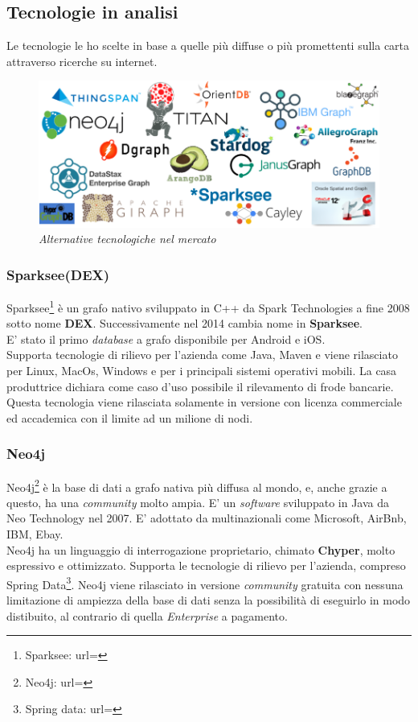 \subsection{Tecnologie in analisi}
Le tecnologie le ho scelte in base a quelle più diffuse o più promettenti sulla carta attraverso ricerche su internet.
\begin{figure}[h!]
	\centering
	\includegraphics[scale=0.35]{immagini/graphdb.png}

	\caption{\textit{Alternative tecnologiche nel mercato }}
\end{figure}

\subsubsection{Sparksee(DEX)}
Sparksee\footnote{Sparksee: url= } è un grafo nativo sviluppato in C++ da Spark Technologies a fine 2008 sotto nome \textbf{DEX}. Successivamente nel 2014 cambia nome in \textbf{Sparksee}.\\
E' stato il primo \textit{database} a grafo disponibile per Android e iOS.\\
Supporta tecnologie di rilievo per l'azienda come Java, Maven e viene rilasciato per Linux, MacOs, Windows e per i principali sistemi operativi mobili.
La casa produttrice dichiara come caso d'uso possibile il rilevamento di frode bancarie.\\
Questa tecnologia viene rilasciata solamente in versione con licenza commerciale ed accademica con il limite ad un milione di nodi.

\subsubsection{Neo4j}
Neo4j\footnote{Neo4j: url= } è la base di dati a grafo nativa più diffusa al mondo, e, anche grazie a questo, ha una \textit{community} molto ampia. E' un \textit{software} sviluppato in Java da Neo Technology nel 2007. E' adottato da multinazionali come Microsoft, AirBnb, IBM, Ebay.\\
Neo4j ha un linguaggio di interrogazione proprietario, chimato \textbf{Chyper}, molto espressivo e ottimizzato. Supporta le tecnologie di rilievo per l'azienda, compreso Spring Data\footnote{Spring data: url= }. Neo4j viene rilasciato in versione \textit{community} gratuita con nessuna limitazione di ampiezza della base di dati senza la possibilità di eseguirlo in modo distibuito, al contrario di quella \textit{Enterprise} a pagamento.

